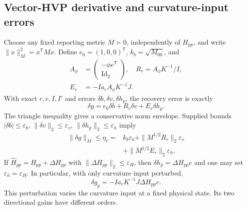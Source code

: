\subsection{Vector-HVP derivative and curvature-input errors}
Choose any fixed reporting metric $M\succ0$, independently of $H_{pp}$, and write $\|x\|_M^2=x^{\mathsf T}Mx$. Define $e_0=(1,0,0)^{\mathsf T}$, $k_b=\sqrt{M_{00}}$, and
\begin{equation}
 \begin{aligned}
 A_\phi&=\begin{pmatrix}-\phi e^{\mathsf T}\\\operatorname{Id}_2\end{pmatrix},\quad
 R_r=A_\phi K^{-1}/I,\\
 E_r&=-Ia_r A_\phi K^{-1}J.
 \end{aligned}
 \label{eq:correctedoperator}
\end{equation}
With exact $r,e,I,I'$ and errors $\delta b,\delta v,\delta h_p$, the recovery error is exactly
\begin{equation}
 \delta g=e_0\delta b+R_r\delta v+E_r\delta h_p.
 \label{eq:curvatureerror}
\end{equation}
The triangle inequality gives a conservative norm envelope. Supplied bounds $|\delta b|\leq\varepsilon_b$, $\|\delta v\|_2\leq\varepsilon_v$, $\|\delta h_p\|_2\leq\varepsilon_h$ imply
\begin{equation}
 \begin{aligned}
 \|\delta g\|_M\leq\eta_r={}&k_b\varepsilon_b
 +\|M^{1/2}R_r\|_2\varepsilon_v\\
 &+\|M^{1/2}E_r\|_2\varepsilon_h.
 \end{aligned}
 \label{eq:correctederror}
\end{equation}
If $\widehat H_{pp}=H_{pp}+\Delta H_{pp}$ with $\|\Delta H_{pp}\|_2\leq\varepsilon_H$, then $\delta h_p=\Delta H_{pp}e$ and one may set $\varepsilon_h=\varepsilon_H$. In particular, with only curvature input perturbed,
\begin{equation}
 \delta g_p=-Ia_rK^{-1}J\Delta H_{pp}e.
 \label{eq:curvaturebias}
\end{equation}
This perturbation varies the curvature input at a fixed physical state. Its two directional gains have different orders.

